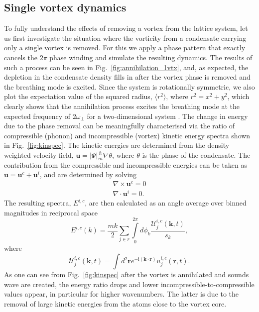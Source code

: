 \subsection{Single vortex dynamics}

To fully understand the effects of removing a vortex from the lattice system, let us first investigate the situation where the vorticity from a condensate carrying only a single vortex is removed. For this we apply a phase pattern that exactly cancels the $2\pi$ phase winding and simulate the resulting dynamics. The results of such a process can be seen in Fig.~\ref{fig:annihilation_1vtx}, and, as expected, the depletion in the condensate density fills in after the vortex phase is removed and the breathing mode is excited. Since the system is rotationally symmetric, we also plot the expectation value of the squared radius, $\langle r^2 \rangle$, where $r^2 = x^2 + y^2$, which clearly shows that the annihilation process excites the breathing mode at the expected frequency of $2\omega_\perp$ for a two-dimensional system \cite{BEC:Pitaevskii_pra_1997}. The change in energy due to the phase removal can be meaningfully characterised via the ratio of compressible (phonon) and incompressible (vortex) kinetic energy spectra shown in Fig.~\ref{fig:kinspec}. The kinetic energies are determined from the density weighted velocity field, $\mathbf{u} = |\Psi|\frac{\hbar}{m}\nabla \theta$, where $\theta$ is the phase of the condensate. The contribution from the compressible and incompressible energies can be taken as $\mathbf{u} = \mathbf{u}^{c} + \mathbf{u}^{i}$, and are determined by solving
\begin{subequations}
    \begin{align}
        \nabla \times \mathbf{u}^{c} = 0 \\
        \nabla \cdot \mathbf{u}^{i} = 0.
    \end{align}
\end{subequations}
The resulting spectra, $E^{i,c}$, are then calculated as an angle average over binned magnitudes in reciprocal space \cite{VTX:Bradley_prx_2012}
\begin{equation}
    E^{i,c}(k) = \frac{mk}{2}\displaystyle\sum_{j\in r}\int\limits_{0}^{2\pi} d\phi_k \frac{\mathcal{U}^{i,c}_j(\mathbf{k},t)}{s_k},
\end{equation}
where
\begin{equation}
    \mathcal{U}^{i,c}_{j}(\mathbf{k},t) = \int d^2\mathbf{r}e^{-\text{i}(\mathbf{k}\cdot \mathbf{r})}u_j^{i,c}(\mathbf{r},t).
\end{equation}
As one can see from Fig.~\ref{fig:kinspec} after the vortex is annihilated and sounds wave are created, the energy ratio drops and lower incompressible-to-compressible values appear, in particular for higher wavenumbers. The latter is due to the removal of large kinetic energies from the atoms close to the vortex core.

